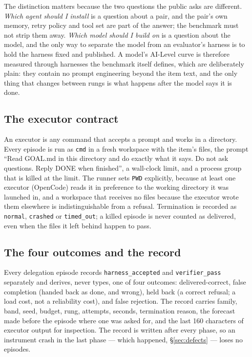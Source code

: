 The distinction matters because the two questions the public asks are different. \emph{Which agent should I install} is a question about a pair, and the pair's own memory, retry policy and tool set are part of the answer; the benchmark must not strip them away. \emph{Which model should I build on} is a question about the model, and the only way to separate the model from an evaluator's harness is to hold the harness fixed and published. A model's AI-Level curve is therefore measured through harnesses the benchmark itself defines, which are deliberately plain: they contain no prompt engineering beyond the item text, and the only thing that changes between rungs is what happens after the model says it is done.

\subsection{The executor contract}

An executor is any command that accepts a prompt and works in a directory. Every episode is run as \texttt{cmd} in a fresh workspace with the item's files, the prompt ``Read GOAL.md in this directory and do exactly what it says. Do not ask questions. Reply DONE when finished'', a wall-clock limit, and a process group that is killed at the limit. The runner sets \texttt{PWD} explicitly, because at least one executor (OpenCode) reads it in preference to the working directory it was launched in, and a workspace that receives no files because the executor wrote them elsewhere is indistinguishable from a refusal. Termination is recorded as \texttt{normal}, \texttt{crashed} or \texttt{timed\_out}; a killed episode is never counted as delivered, even when the files it left behind happen to pass.

\subsection{The four outcomes and the record}

Every delegation episode records \texttt{harness\_accepted} and \texttt{verifier\_pass} separately and derives, never types, one of four outcomes: delivered-correct, false completion (handed back as done, and wrong), held back (a correct refusal; a load cost, not a reliability cost), and false rejection. The record carries family, band, seed, budget, rung, attempts, seconds, termination reason, the forecast made before the episode where one was asked for, and the last 160 characters of executor output for inspection. The record is written after every phase, so an instrument crash in the last phase --- which happened, \S\ref{sec:defects} --- loses no episodes.

